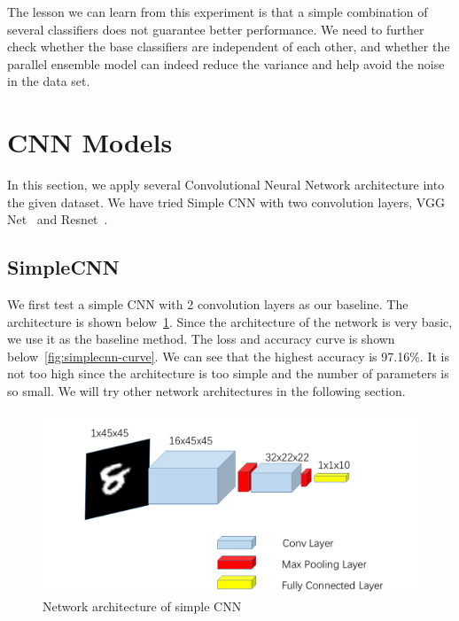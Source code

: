 \documentclass{article}
\begin{document}
The lesson we can learn from this experiment is that a simple combination of several classifiers does not guarantee better performance. We need to further check whether the base classifiers are independent of each other, and whether the parallel ensemble model can indeed reduce the variance and help avoid the noise in the data set.

\section{CNN Models}

In this section, we apply several Convolutional Neural Network architecture into the given dataset. We have tried Simple CNN with two convolution layers, VGG Net~\cite{simonyan2014very} and Resnet~\cite{he2016deep}.

\subsection{SimpleCNN}

We first test a simple CNN with 2 convolution layers as our baseline. The architecture is shown below~\ref{fig:simplecnn}. Since the architecture of the network is very basic, we use it as the baseline method. The loss and accuracy curve is shown below~\ref{fig:simplecnn-curve}. We can see that the highest accuracy is 97.16\%. It is not too high since the architecture is too simple and the number of parameters is so small. We will try other network architectures in the following section.

\begin{figure}[!htb]
	\centering\includegraphics[width=1.0\textwidth]{fig/simplecnn.png}
	\caption{Network architecture of simple CNN }\label{fig:simplecnn}
\end{figure}
\end{document}
